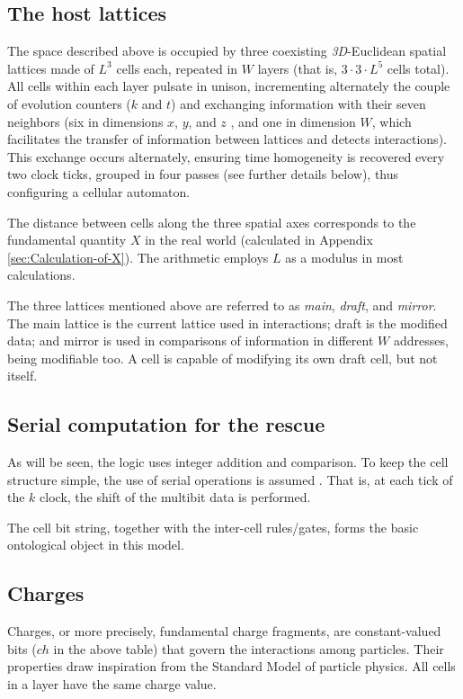 \documentclass[12pt,english]{article}
\begin{document}
\subsection{The host lattices\label{subsec:The-host-lattice}}

The space described above is occupied by three coexisting \emph{3D}-Euclidean spatial lattices made of $L^{3}$ cells each, repeated in $W$ layers (that is, $3\cdot3\cdot L^{5}$ cells total). All cells within each layer pulsate in unison, incrementing alternately the couple of evolution counters ($k$ and $t$) and exchanging information with their seven neighbors (six in dimensions $x$, $y$, and \ensuremath{z} , and one in dimension $W$, which facilitates the transfer of information between lattices and detects interactions). This exchange occurs alternately, ensuring time homogeneity is recovered every two clock ticks, grouped in four passes (see further details below), thus configuring a cellular automaton. 

The distance between cells along the three spatial axes corresponds to the fundamental quantity $X$ in the real world (calculated in Appendix \ref{sec:Calculation-of-X}). The arithmetic employs $L$ as a modulus in most calculations.

The three lattices mentioned above are referred to as \textit{main}, \textit{draft}, and \textit{mirror}. The main lattice is the current lattice used in interactions; draft is the modified data; and mirror is used in comparisons of information in different $W$ addresses, being modifiable too. A cell is capable of modifying its own draft cell, but not itself.

\subsection{Serial computation for the rescue}

As will be seen, the logic uses integer addition and comparison. To keep the cell structure simple, the use of serial operations is assumed \cite{mano1993csa}. That is, at each tick of the $k$ clock, the shift of the multibit data is performed.

The cell bit string, together with the inter-cell rules/gates, forms the basic ontological object in this model.

\subsection{Charges}
Charges, or more precisely, fundamental charge fragments, are constant-valued bits ($ch$ in the above table) that govern the interactions among particles. Their properties draw inspiration from the Standard Model of particle physics. All cells in a layer have the same charge value.
\end{document}
